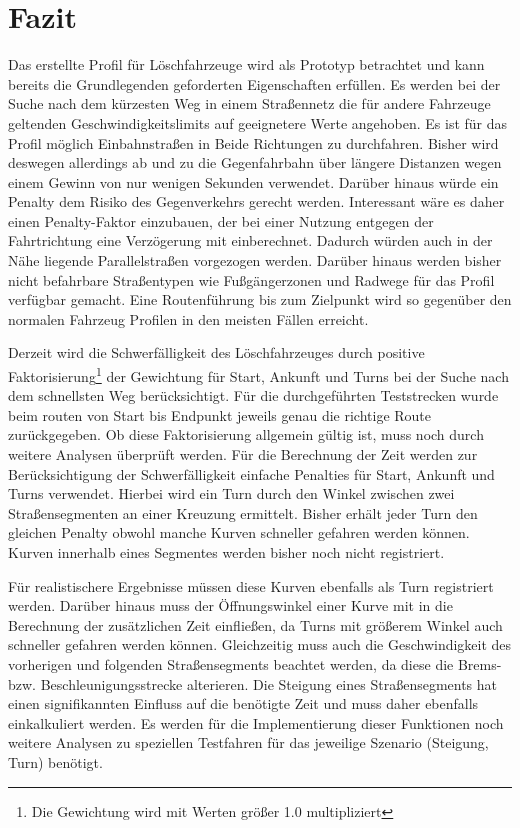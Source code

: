 \section{Fazit}

Das erstellte Profil für Löschfahrzeuge wird als Prototyp betrachtet und kann bereits die Grundlegenden geforderten Eigenschaften erfüllen. Es werden bei der Suche nach dem kürzesten Weg in einem Straßennetz die für andere Fahrzeuge geltenden Geschwindigkeitslimits auf geeignetere Werte angehoben. 
Es ist für das Profil möglich Einbahnstraßen in Beide Richtungen zu durchfahren. Bisher wird deswegen allerdings ab und zu die Gegenfahrbahn über längere Distanzen wegen einem Gewinn von nur wenigen Sekunden verwendet. Darüber hinaus würde ein Penalty dem Risiko des Gegenverkehrs gerecht werden. Interessant wäre es daher einen Penalty-Faktor einzubauen, der bei einer Nutzung entgegen der Fahrtrichtung eine Verzögerung mit einberechnet. Dadurch würden auch in der Nähe liegende Parallelstraßen vorgezogen werden.
Darüber hinaus werden bisher nicht befahrbare Straßentypen wie Fußgängerzonen und Radwege für das Profil verfügbar gemacht. Eine Routenführung bis zum Zielpunkt wird so gegenüber den normalen Fahrzeug Profilen in den meisten Fällen erreicht.

Derzeit wird die Schwerfälligkeit des Löschfahrzeuges durch positive Faktorisierung\footnote{Die Gewichtung wird mit Werten größer 1.0 multipliziert} der Gewichtung für Start, Ankunft und Turns bei der Suche nach dem schnellsten Weg berücksichtigt. Für die durchgeführten Teststrecken wurde beim routen von Start bis Endpunkt jeweils genau die richtige Route zurückgegeben. Ob diese Faktorisierung allgemein gültig ist, muss noch durch weitere Analysen überprüft werden.
Für die Berechnung der Zeit werden zur Berücksichtigung der Schwerfälligkeit einfache Penalties für Start, Ankunft und Turns verwendet. Hierbei wird ein Turn durch den Winkel zwischen zwei Straßensegmenten an einer Kreuzung ermittelt. Bisher erhält jeder Turn den gleichen Penalty obwohl manche Kurven schneller gefahren werden können. Kurven innerhalb eines Segmentes werden bisher noch nicht registriert.

Für realistischere Ergebnisse müssen diese Kurven ebenfalls als Turn registriert werden. Darüber hinaus muss der Öffnungswinkel einer Kurve mit in die Berechnung der zusätzlichen Zeit einfließen, da Turns mit größerem Winkel auch schneller gefahren werden können. Gleichzeitig muss auch die Geschwindigkeit des vorherigen und folgenden Straßensegments beachtet werden, da diese die Brems- bzw. Beschleunigungsstrecke alterieren.
Die Steigung eines Straßensegments hat einen signifikannten Einfluss auf die benötigte Zeit und muss daher ebenfalls einkalkuliert werden.
Es werden für die Implementierung dieser Funktionen noch weitere Analysen zu speziellen Testfahren für das jeweilige Szenario (Steigung, Turn) benötigt.

